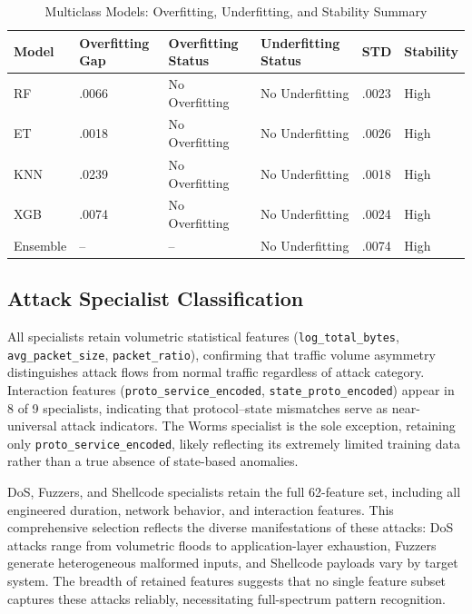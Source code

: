 \documentclass[pdflatex,sn-mathphys-num]{sn-jnl}
\theoremstyle{thmstyleone}%
\theoremstyle{thmstyletwo}%
\theoremstyle{thmstylethree}%
\begin{document}
\begin{table}[htbp]
\centering
\small
\caption{Multiclass Models: Overfitting, Underfitting, and Stability Summary}
\label{MulticlassStabality}
\renewcommand{\arraystretch}{1.0}
\setlength{\tabcolsep}{4pt}
\begin{tabular}{@{}p{1.3cm}p{2.2cm}p{2.4cm}p{2.8cm}p{1.3cm}p{1.8cm}@{}}
\toprule
\textbf{Model} 
& \textbf{Overfitting Gap} 
& \textbf{Overfitting Status}
& \textbf{Underfitting Status} 
& \textbf{STD} 
& \textbf{Stability} \\
\midrule

RF       & .0066 & No Overfitting & No Underfitting & .0023  & High \\
ET       & .0018 & No Overfitting & No Underfitting & .0026  & High \\
KNN      & .0239 & No Overfitting & No Underfitting & .0018  & High \\
XGB      & .0074 & No Overfitting & No Underfitting & .0024  & High \\
Ensemble & --    & --             & No Underfitting & .0074  & High \\

\bottomrule
\end{tabular}
\end{table}

\subsection{Attack Specialist Classification}
All specialists retain volumetric statistical features (\texttt{log\_total\_bytes}, \texttt{avg\_packet\_size}, \texttt{packet\_ratio}), confirming that traffic volume asymmetry distinguishes attack flows from normal traffic regardless of attack category. Interaction features (\texttt{proto\_service\_encoded}, \texttt{state\_proto\_encoded}) appear in 8 of 9 specialists, indicating that protocol--state mismatches serve as near-universal attack indicators. The Worms specialist is the sole exception, retaining only \texttt{proto\_service\_encoded}, likely reflecting its extremely limited training data rather than a true absence of state-based anomalies.

DoS, Fuzzers, and Shellcode specialists retain the full 62-feature set, including all engineered duration, network behavior, and interaction features. This comprehensive selection reflects the diverse manifestations of these attacks: DoS attacks range from volumetric floods to application-layer exhaustion, Fuzzers generate heterogeneous malformed inputs, and Shellcode payloads vary by target system. The breadth of retained features suggests that no single feature subset captures these attacks reliably, necessitating full-spectrum pattern recognition.
\end{document}
